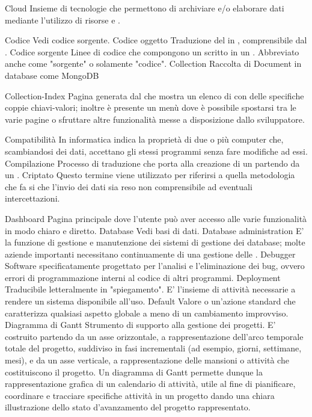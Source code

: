 \elemento
{Cloud} 
{Insieme di tecnologie che permettono di archiviare e/o elaborare dati mediante l'utilizzo di risorse  e .}

\elemento
{Codice} 
{Vedi codice sorgente.}
\elemento
{Codice oggetto}
{Traduzione del  in , comprensibile dal .}
\elemento
{Codice sorgente}
{Linee di codice che compongono un  scritto in un . Abbreviato anche come "sorgente" o solamente "codice".}
\elemento
{Collection} 
{Raccolta di Document in database come MongoDB}


\elemento
{Collection-Index} 
{Pagina generata dal   che mostra un elenco di  con delle specifiche coppie chiavi-valori; inoltre è presente un menù dove è possibile spostarsi tra le varie pagine  o sfruttare altre funzionalità messe a disposizione dallo sviluppatore.}


\elemento
{Compatibilità}
{In informatica indica la proprietà di due o più computer che, scambiandosi dei dati, accettano gli stessi programmi senza fare modifiche ad essi.}
\elemento
{Compilazione} 
{Processo di traduzione che porta alla creazione di un  partendo da un .}
\elemento
{Criptato} 
{Questo termine viene utilizzato per riferirsi a quella metodologia che fa si che l'invio dei dati sia reso non comprensibile ad eventuali intercettazioni.}

\elemento
{Dashboard}
{Pagina principale dove l'utente può aver accesso alle varie funzionalità in modo chiaro e diretto.}
\elemento
{Database} 
{Vedi basi di dati.}
\elemento
{Database administration} 
{E' la funzione di gestione e manutenzione dei sistemi di gestione dei database; molte aziende importanti necessitano continuamente di una gestione delle .}
\elemento
{Debugger} 
{Software specificatamente progettato per l'analisi e l'eliminazione dei bug, ovvero errori di programmazione interni al codice di altri programmi.}
\elemento
{Deployment} 
{Traducibile letteralmente in "spiegamento". E' l'insieme di attività necessarie a rendere un sistema  disponibile all'uso.}
\elemento
{Default} 
{Valore o un'azione standard che caratterizza qualsiasi aspetto globale a meno di un cambiamento improvviso.}
\elemento
{Diagramma di Gantt}
{Strumento di supporto alla gestione dei progetti. E' costruito partendo da un asse orizzontale, a rappresentazione dell'arco temporale totale del progetto, suddiviso in fasi incrementali (ad esempio, giorni, settimane, mesi), e da un asse verticale, a rappresentazione delle mansioni o attività che costituiscono il progetto. Un diagramma di Gantt permette dunque la rappresentazione grafica di un calendario di attività, utile al fine di pianificare, coordinare e tracciare specifiche attività in un progetto dando una chiara illustrazione dello stato d'avanzamento del progetto rappresentato.} 


